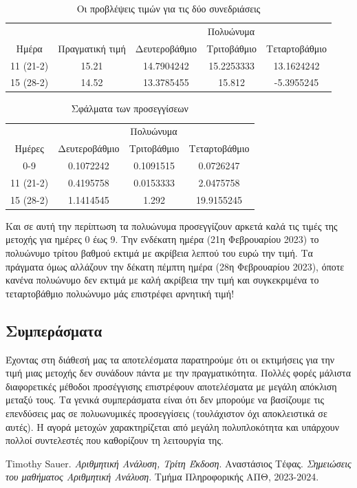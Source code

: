 \documentclass[a4paper,11pt]{article}
\newcommand{\lt}{\latintext}
\newcommand{\gt}{\greektext}
\begin{document}
\begin{table}[h!]
\centering
\begin{tabular}{c c| c c c}
    & & \multicolumn{3}{c}{Πολυώνυμα} \\
   Ημέρα & Πραγματική τιμή & Δευτεροβάθμιο & Τριτοβάθμιο & Τεταρτοβάθμιο \\
   11 (21-2) & 15.21 & 14.7904242 & 15.2253333 & 13.1624242 \\
   15 (28-2) & 14.52 & 13.3785455 & 15.812 & -5.3955245 \\
\end{tabular}
\caption{Οι προβλέψεις τιμών για τις δύο συνεδριάσεις}
\label{fig:table7c}
\end{table}

\begin{table}[h!]
\centering
\begin{tabular}{c c c c}
    & \multicolumn{3}{c}{Πολυώνυμα} \\
   Ημέρες & Δευτεροβάθμιο & Τριτοβάθμιο & Τεταρτοβάθμιο \\
   0-9 & 0.1072242 & 0.1091515 & 0.0726247 \\
   11 (21-2) & 0.4195758 & 0.0153333 & 2.0475758 \\
   15 (28-2) & 1.1414545 & 1.292 & 19.9155245 \\
\end{tabular}
\caption{Σφάλματα των προσεγγίσεων}
\label{fig:table7d}
\end{table}

Και σε αυτή την περίπτωση τα πολυώνυμα προσεγγίζουν αρκετά καλά τις τιμές της μετοχής για ημέρες 0 έως 9. Την ενδέκατη ημέρα (21η Φεβρουαρίου 2023) το πολυώνυμο τρίτου βαθμού εκτιμά με ακρίβεια λεπτού του ευρώ την τιμή. Τα πράγματα όμως αλλάζουν την δέκατη πέμπτη ημέρα (28η Φεβρουαρίου 2023), όποτε κανένα πολυώνυμο δεν εκτιμά με καλή ακρίβεια την τιμή και συγκεκριμένα το τεταρτοβάθμιο πολυώνυμο μάς επιστρέφει αρνητική τιμή! 

\subsection{Συμπεράσματα}

Έχοντας στη διάθεσή μας τα αποτελέσματα παρατηρούμε ότι οι εκτιμήσεις για την τιμή μιας μετοχής δεν συνάδουν πάντα με την πραγματικότητα. Πολλές φορές μάλιστα διαφορετικές μέθοδοι προσέγγισης επιστρέφουν αποτελέσματα με μεγάλη απόκλιση μεταξύ τους. Τα γενικά συμπεράσματα είναι ότι δεν μπορούμε να βασίζουμε τις επενδύσεις μας σε πολυωνυμικές προσεγγίσεις (τουλάχιστον όχι αποκλειστικά σε αυτές). Η αγορά μετοχών χαρακτηρίζεται από μεγάλη πολυπλοκότητα και υπάρχουν πολλοί συντελεστές που καθορίζουν τη λειτουργία της.

\begin{thebibliography}{2}

\lt
{}Timothy Sauer. \gt \emph{Αριθμητική Ανάλυση, Τρίτη Έκδοση}. 
Αναστάσιος Τέφας. \emph{Σημειώσεις του μαθήματος Αριθμητική Ανάλυση}. Τμήμα Πληροφορικής ΑΠΘ, 2023-2024.
    
\end{thebibliography}
\end{document}
